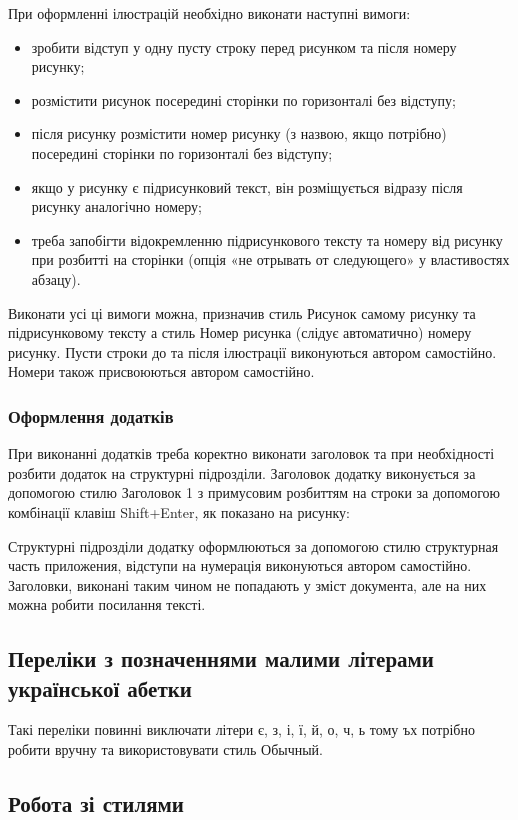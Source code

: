 При оформленні ілюстрацій необхідно виконати наступні вимоги:
\begin{itemize}
\item зробити відступ у одну пусту строку перед рисунком та після номеру рисунку;
\item розмістити рисунок посередині сторінки по горизонталі без відступу;
\item після рисунку розмістити номер рисунку (з назвою, якщо потрібно) посередині сторінки по горизонталі без відступу;
\item якщо у рисунку є підрисунковий текст, він розміщується відразу після рисунку аналогічно номеру;
\item треба запобігти відокремленню підрисункового тексту та номеру від рисунку при розбитті на сторінки (опція «не отрывать от следующего» у властивостях абзацу).
\end{itemize}

Виконати усі ці вимоги можна, призначив стиль Рисунок самому рисунку та підрисунковому тексту а стиль Номер рисунка (слідує автоматично) номеру рисунку. Пусти строки до та після ілюстрації виконуються автором самостійно. Номери також присвоюються автором самостійно.

\subsubsection{Оформлення додатків}

При виконанні додатків треба коректно виконати заголовок та при необхідності розбити додаток на структурні підрозділи. Заголовок додатку виконується за допомогою стилю Заголовок 1 з примусовим розбиттям на строки за допомогою комбінації клавіш Shift+Enter, як показано на рисунку:

Структурні підрозділи додатку оформлюються за допомогою стилю структурная часть приложения, відступи на нумерація виконуються автором самостійно. Заголовки, виконані таким чином не попадають у зміст документа, але на них можна робити посилання тексті.

\subsection{Переліки з позначеннями малими літерами української абетки}

Такі переліки повинні виключати літери є, з, і, ї, й, о, ч, ь тому ъх потрібно робити вручну та використовувати стиль Обычный.

\subsection{Робота зі стилями}

